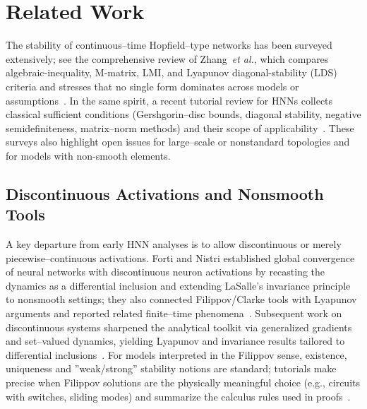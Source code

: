 \documentclass[journal]{IEEEtran}
\begin{document}

\section{Related Work}\label{sec:related}

The stability of continuous–time Hopfield–type networks has been surveyed extensively; 
see the comprehensive review of Zhang~\emph{et al.}, 
which compares algebraic-inequality, M-matrix, LMI, and Lyapunov diagonal-stability (LDS) criteria 
and stresses that no single form dominates across models or assumptions~\cite{ZhangTNNLSReview2014}. 
In the same spirit, a recent tutorial review for HNNs collects classical sufficient conditions 
(Gershgorin–disc bounds, diagonal stability, negative semidefiniteness, matrix–norm methods) 
and their scope of applicability~\cite{BoykovRoudnev2022}. 
These surveys also highlight open issues for large–scale 
or nonstandard topologies and for models with non-smooth elements.

\subsection{Discontinuous Activations and Nonsmooth Tools}

A key departure from early HNN analyses is to allow discontinuous 
or merely piecewise–continuous activations. 
Forti and Nistri established global convergence of neural networks 
with discontinuous neuron activations by recasting the dynamics as a differential inclusion 
and extending LaSalle’s invariance principle to nonsmooth settings; 
they also connected Filippov/Clarke tools with Lyapunov arguments 
and reported related finite–time phenomena~\cite{p1}. 
Subsequent work on discontinuous systems sharpened the analytical toolkit 
via generalized gradients and set–valued dynamics, 
yielding Lyapunov and invariance results tailored 
to differential inclusions~\cite{ShevitzPaden1994,CortesTutorial2008,YLG}.
For models interpreted in the Filippov sense, 
existence, uniqueness and ''weak/strong'' stability notions are standard; 
tutorials make precise when Filippov solutions are the physically meaningful choice 
(e.g., circuits with switches, sliding modes) and summarize the calculus rules used in proofs~\cite{CortesTutorial2008}.
\end{document}
